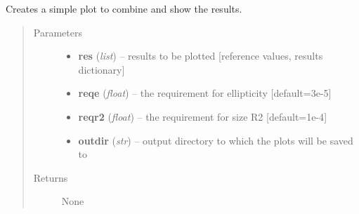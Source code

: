 \documentclass[a4paper,11pt,english]{sphinxmanual}
\begin{document}
\begin{fulllineitems}
\label{reduction:analysis.cosmicrayCalibration.plotResults}
Creates a simple plot to combine and show the results.
\begin{quote}\begin{description}
\item[{Parameters}] \leavevmode\begin{itemize}
\item {} 
\textbf{res} (\emph{list}) -- results to be plotted {[}reference values, results dictionary{]}

\item {} 
\textbf{reqe} (\emph{float}) -- the requirement for ellipticity {[}default=3e-5{]}

\item {} 
\textbf{reqr2} (\emph{float}) -- the requirement for size R2 {[}default=1e-4{]}

\item {} 
\textbf{outdir} (\emph{str}) -- output directory to which the plots will be saved to

\end{itemize}

\item[{Returns}] \leavevmode
None

\end{description}\end{quote}

\end{fulllineitems}

\end{document}
